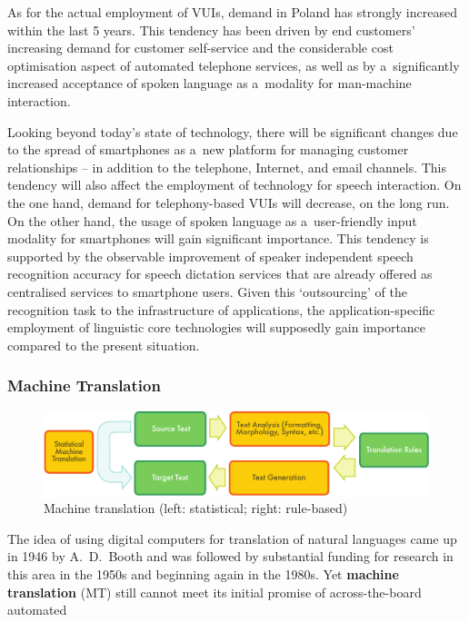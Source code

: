 \begin{multicols}{2}
As for the actual employment of VUIs, demand in Poland has strongly
increased within the last 5 years. This tendency has been driven by
end customers’ increasing demand for customer self-service and the
considerable cost optimisation aspect of automated telephone services,
as well as by a~significantly increased acceptance of spoken language
as a~modality for man-machine interaction. 

Looking beyond today’s state of technology, there will be
significant changes due to the spread of smartphones as a~new platform
for managing customer relationships – in addition to the telephone,
Internet, and email channels. This tendency will also affect the
employment of technology for speech interaction. On the one hand,
demand for telephony-based VUIs will decrease, on the long run. On the
other hand, the usage of spoken language as a~user-friendly input
modality for smartphones will gain significant importance. This
tendency is supported by the observable improvement of speaker
independent speech recognition accuracy for speech dictation services
that are already offered as centralised services to smartphone users.
Given this ‘outsourcing’ of the recognition task to the
infrastructure of applications, the application-specific employment of
linguistic core technologies will supposedly gain importance compared
to the present situation. 

\subsubsection{Machine Translation} 

\begin{figure}[htb]  \center
\includegraphics[width=\textwidth]{../_media/english/machine_translation}
\caption{Machine translation (left: statistical; right: rule-based)}
\label{fig:mtarch_en} 
\end{figure} 

The idea of using digital computers for translation of natural
languages came up in 1946 by A.~D.~Booth and was followed by
substantial funding for research in this area in the 1950s and
beginning again in the 1980s. Yet \textbf{machine translation} (MT)
still cannot meet its initial promise of across-the-board automated


\end{multicols}
